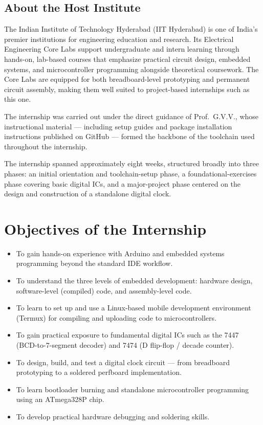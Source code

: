 \documentclass[12pt,a4paper]{report}
\begin{document}
\section{About the Host Institute}
\label{sec:host}

The Indian Institute of Technology Hyderabad (IIT Hyderabad) is one of India's premier institutions for engineering education and research. Its Electrical Engineering Core Labs support undergraduate and intern learning through hands-on, lab-based courses that emphasize practical circuit design, embedded systems, and microcontroller programming alongside theoretical coursework. The Core Labs are equipped for both breadboard-level prototyping and permanent circuit assembly, making them well suited to project-based internships such as this one.

The internship was carried out under the direct guidance of Prof.\ G.V.V., whose instructional material --- including setup guides and package installation instructions published on GitHub --- formed the backbone of the toolchain used throughout the internship.

The internship spanned approximately eight weeks, structured broadly into three phases: an initial orientation and toolchain-setup phase, a foundational-exercises phase covering basic digital ICs, and a major-project phase centered on the design and construction of a standalone digital clock.

\chapter{Objectives of the Internship}
\label{ch:objectives}

\begin{itemize}
    \item To gain hands-on experience with Arduino and embedded systems programming beyond the standard IDE workflow.
    \item To understand the three levels of embedded development: hardware design, software-level (compiled) code, and assembly-level code.
    \item To learn to set up and use a Linux-based mobile development environment (Termux) for compiling and uploading code to microcontrollers.
    \item To gain practical exposure to fundamental digital ICs such as the 7447 (BCD-to-7-segment decoder) and 7474 (D flip-flop / decade counter).
    \item To design, build, and test a digital clock circuit --- from breadboard prototyping to a soldered perfboard implementation.
    \item To learn bootloader burning and standalone microcontroller programming using an ATmega328P chip.
    \item To develop practical hardware debugging and soldering skills.
\end{itemize}
\end{document}
